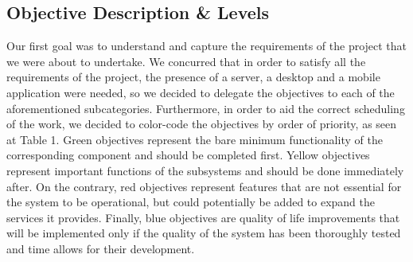 \documentclass[11pt]{article}
\begin{document}
\subsection{Objective Description \& Levels}
Our first goal was to understand and capture the requirements of the project that we were about to undertake. We concurred that in order to satisfy all the requirements of the project, the presence of a server, a desktop and a mobile application were needed, so we decided to delegate the objectives to each of the aforementioned subcategories. Furthermore, in order to aid the correct scheduling of the work, we decided to color-code the objectives by order of priority, as seen at Table 1. Green objectives represent the bare minimum functionality of the corresponding component and should be completed first. Yellow objectives represent important functions of the subsystems and should be done immediately after. On the contrary, red objectives represent features that are not essential for the system to be operational, but could potentially be added to expand the services it provides. Finally, blue objectives are quality of life improvements that will be implemented only if the quality of the system has been thoroughly tested and time allows for their development.\\
	
\begin{table}[htb]
	\noindent{}
	\caption{Color-Coded Objectives}
\end{table} 
\end{document}
